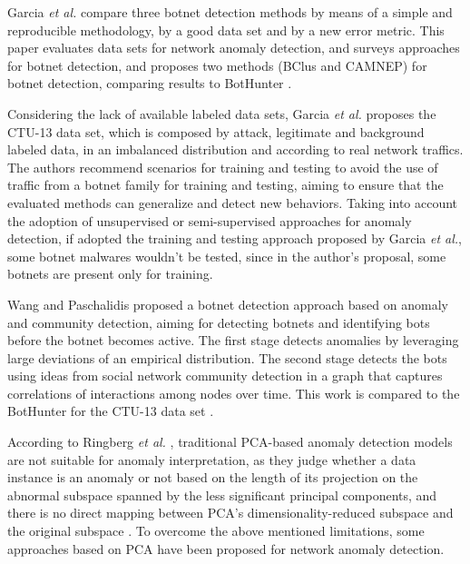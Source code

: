 \documentclass[review]{elsarticle}
\begin{document}
Garcia \emph{et al.} \cite{garcia2014empirical} compare three botnet detection methods by means of a simple and reproducible methodology, by a good data set and by a new error metric. This paper evaluates data sets for network anomaly detection, and surveys approaches for botnet detection, and proposes two methods (BClus and CAMNEP) for botnet detection, comparing results to BotHunter \cite{gu2007bothunter}.

Considering the lack of available labeled data sets, Garcia \emph{et al.} \cite{garcia2014empirical} proposes the CTU-13 data set, which is composed by attack, legitimate and background labeled data, in an imbalanced distribution and according to real network traffics. The authors recommend scenarios for training and testing to avoid the use of traffic from a botnet family for training and testing, aiming to ensure that the evaluated methods can generalize and detect new behaviors. Taking into account the adoption of unsupervised or semi-supervised approaches for anomaly detection, if adopted the training and testing approach proposed by Garcia \emph{et al.}, some botnet malwares wouldn't be tested, since in the author's proposal, some botnets are present only for training.

Wang and Paschalidis \cite{wang2017botnet} proposed a botnet detection approach based on anomaly and community detection, aiming for detecting botnets and identifying bots before the botnet becomes active. The first stage detects anomalies by leveraging large deviations of an empirical distribution. The second stage detects the bots using ideas from social network community detection in a graph that captures correlations of interactions among nodes over time. This work is compared to the BotHunter \cite{gu2007bothunter} for the CTU-13 data set \cite{garcia2014empirical}.

According to Ringberg \emph{et al.} \cite{ringberg2007sensitivity}, traditional PCA-based anomaly detection models are not suitable for anomaly interpretation, as they judge whether a data instance is an anomaly or not based on the length of its projection on the abnormal subspace spanned by the less significant principal components, and there is no direct mapping between PCA’s dimensionality-reduced subspace and the original subspace \cite{ringberg2007sensitivity}. To overcome the above mentioned limitations, some approaches based on PCA have been proposed for network anomaly detection. 
\end{document}
